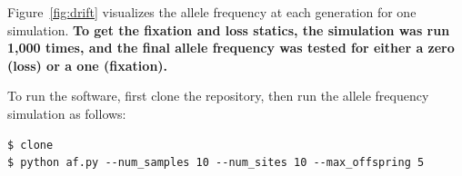 \documentclass[11pt, letterpaper]{article}
\begin{document}
Figure~\ref{fig:drift} visualizes the allele frequency at each generation for
one simulation.  {\bf To get the fixation and loss statics, the simulation was run
1,000 times, and the final allele frequency was tested for either a zero (loss)
or a one (fixation).}

To run the software, first clone the repository, then run the allele frequency
simulation as follows:
\begin{verbatim}
$ clone 
$ python af.py --num_samples 10 --num_sites 10 --max_offspring 5
\end{verbatim}
\end{document}
